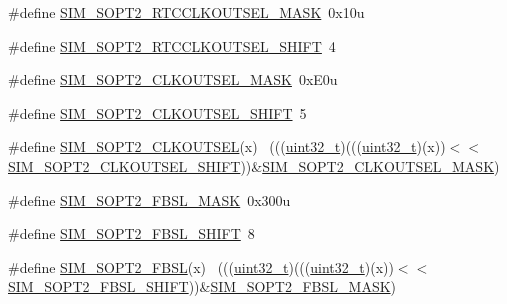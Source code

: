 \begin{DoxyCompactItemize}
\item 
\#define \hyperlink{group___s_i_m___register___masks_ga4ecc21f62a92e94e5f507a6bb5e44062}{S\+I\+M\+\_\+\+S\+O\+P\+T2\+\_\+\+R\+T\+C\+C\+L\+K\+O\+U\+T\+S\+E\+L\+\_\+\+M\+A\+SK}~0x10u
\item 
\#define \hyperlink{group___s_i_m___register___masks_gaa4b7f7e8f1999ec0d56a1224cf7eb35d}{S\+I\+M\+\_\+\+S\+O\+P\+T2\+\_\+\+R\+T\+C\+C\+L\+K\+O\+U\+T\+S\+E\+L\+\_\+\+S\+H\+I\+FT}~4
\item 
\#define \hyperlink{group___s_i_m___register___masks_ga601bb7007f58e3ad5433d3538f4dcef0}{S\+I\+M\+\_\+\+S\+O\+P\+T2\+\_\+\+C\+L\+K\+O\+U\+T\+S\+E\+L\+\_\+\+M\+A\+SK}~0x\+E0u
\item 
\#define \hyperlink{group___s_i_m___register___masks_ga520c9a255ff79372237f5f332f749112}{S\+I\+M\+\_\+\+S\+O\+P\+T2\+\_\+\+C\+L\+K\+O\+U\+T\+S\+E\+L\+\_\+\+S\+H\+I\+FT}~5
\item 
\#define \hyperlink{group___s_i_m___register___masks_ga7faedd289e00fe163a5dc4f22b9fa3fb}{S\+I\+M\+\_\+\+S\+O\+P\+T2\+\_\+\+C\+L\+K\+O\+U\+T\+S\+EL}(x)                                  ~(((\hyperlink{_p_e___types_8h_a33594304e786b158f3fb30289278f5af}{uint32\+\_\+t})(((\hyperlink{_p_e___types_8h_a33594304e786b158f3fb30289278f5af}{uint32\+\_\+t})(x))$<$$<$\hyperlink{group___s_i_m___register___masks_ga520c9a255ff79372237f5f332f749112}{S\+I\+M\+\_\+\+S\+O\+P\+T2\+\_\+\+C\+L\+K\+O\+U\+T\+S\+E\+L\+\_\+\+S\+H\+I\+FT}))\&\hyperlink{group___s_i_m___register___masks_ga601bb7007f58e3ad5433d3538f4dcef0}{S\+I\+M\+\_\+\+S\+O\+P\+T2\+\_\+\+C\+L\+K\+O\+U\+T\+S\+E\+L\+\_\+\+M\+A\+SK})
\item 
\#define \hyperlink{group___s_i_m___register___masks_ga27b0cb220aaf94e8d04795bd682ebd78}{S\+I\+M\+\_\+\+S\+O\+P\+T2\+\_\+\+F\+B\+S\+L\+\_\+\+M\+A\+SK}~0x300u
\item 
\#define \hyperlink{group___s_i_m___register___masks_ga7077057e2a7f0841d8151d2703d85f16}{S\+I\+M\+\_\+\+S\+O\+P\+T2\+\_\+\+F\+B\+S\+L\+\_\+\+S\+H\+I\+FT}~8
\item 
\#define \hyperlink{group___s_i_m___register___masks_ga7bb05630a58acb5628192ffdb8207295}{S\+I\+M\+\_\+\+S\+O\+P\+T2\+\_\+\+F\+B\+SL}(x)                                            ~(((\hyperlink{_p_e___types_8h_a33594304e786b158f3fb30289278f5af}{uint32\+\_\+t})(((\hyperlink{_p_e___types_8h_a33594304e786b158f3fb30289278f5af}{uint32\+\_\+t})(x))$<$$<$\hyperlink{group___s_i_m___register___masks_ga7077057e2a7f0841d8151d2703d85f16}{S\+I\+M\+\_\+\+S\+O\+P\+T2\+\_\+\+F\+B\+S\+L\+\_\+\+S\+H\+I\+FT}))\&\hyperlink{group___s_i_m___register___masks_ga27b0cb220aaf94e8d04795bd682ebd78}{S\+I\+M\+\_\+\+S\+O\+P\+T2\+\_\+\+F\+B\+S\+L\+\_\+\+M\+A\+SK})

\end{DoxyCompactItemize}
